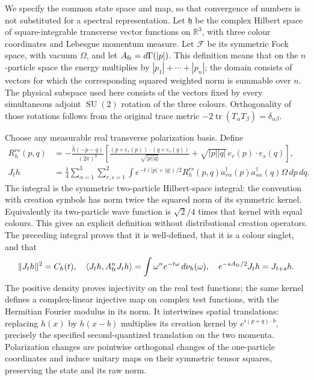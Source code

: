 \documentclass[11pt]{article}
\newcommand{\SU}{\operatorname{SU}}
\newcommand{\tr}{\operatorname{tr}}
\begin{document}
We specify the common state space and map, so that convergence of
numbers is not substituted for a spectral representation. Let
$\mathfrak h$ be the complex Hilbert space of square-integrable
transverse vector functions on $\mathbb R^3$, with three colour
coordinates and Lebesgue momentum measure. Let $\mathcal F$ be
its symmetric Fock space, with vacuum $\Omega$, and let
$A_{\rm fr}=d\Gamma(|p|)$. This definition means that on the
$n$-particle space the energy multiplies by
$|p_1|+\cdots+|p_n|$; the domain consists of vectors for which
the corresponding squared weighted norm is summable over $n$.
The physical subspace used here consists of the vectors fixed by
every simultaneous adjoint $\SU(2)$ rotation of the three colours.
Orthogonality
of those rotations follows from the original trace metric
$-2\tr(T_\alpha T_\beta)=\delta_{\alpha\beta}$.

Choose any measurable real transverse polarization basis. Define
\begin{align}
 R_h^{rs}(p,q)&=-\frac{\widehat h(-p-q)}{(2\pi)^3}
 \left[\frac{(p\times e_r(p))\cdot(q\times e_s(q))}{\sqrt{|p||q|}}
       +\sqrt{|p||q|}\,e_r(p)\cdot e_s(q)\right],\nonumber\\
 J_t h&=\frac14\sum_{\alpha=1}^3\sum_{r,s=1}^2
 \int e^{-t(|p|+|q|)/2}R_h^{rs}(p,q)
    a^\dagger_{r\alpha}(p)a^\dagger_{s\alpha}(q)\Omega\,dp\,dq.
 \label{eq:full-state-map}
\end{align}
The integral is the symmetric two-particle Hilbert-space integral:
the convention with creation symbols has norm twice the squared
norm of its symmetric kernel. Equivalently its two-particle wave
function is $\sqrt2/4$ times that kernel with equal colours.
This gives an explicit definition without distributional creation
operators. The preceding integral proves that it is well-defined,
that it is a colour singlet, and that
\[
 \|J_t h\|^2=C_h(t),\quad
 \langle J_t h,A_{\rm fr}^nJ_t h\rangle
       =\int\omega^n e^{-t\omega}\,d\nu_h(\omega),\quad
 e^{-sA_{\rm fr}/2}J_t h=J_{t+s}h.
\]
The positive density proves injectivity on the real test functions;
the same kernel defines a complex-linear injective map on complex
test functions, with the Hermitian Fourier modulus in its norm.
It intertwines spatial translations: replacing $h(x)$ by $h(x-b)$
multiplies its creation kernel by $e^{i(p+q)\cdot b}$, precisely
the specified second-quantized translation on the two momenta.
Polarization changes are pointwise orthogonal changes of the
one-particle coordinates and induce unitary maps on their symmetric
tensor squares, preserving the state and its raw norm.
\end{document}
